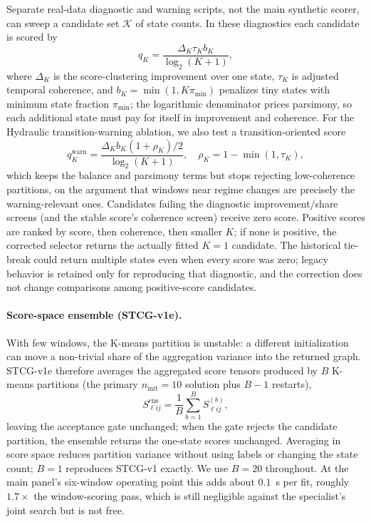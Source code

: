 \documentclass[sigconf,anonymous]{acmart}
\begin{document}
Separate real-data diagnostic and warning scripts, not the main synthetic scorer, can sweep a candidate set $\mathcal{K}$ of state counts. In these diagnostics each candidate is scored by
\[
q_K = \frac{\Delta_K \tau_K b_K}{\log_2(K+1)},
\]
where $\Delta_K$ is the score-clustering improvement over one state, $\tau_K$ is adjusted temporal coherence, and $b_K=\min(1,K\pi_{\min})$ penalizes tiny states with minimum state fraction $\pi_{\min}$; the logarithmic denominator prices parsimony, so each additional state must pay for itself in improvement and coherence.
For the Hydraulic transition-warning ablation, we also test a transition-oriented score
\[
q^{\mathrm{warn}}_K =
\frac{\Delta_K b_K(1+\rho_K)/2}{\log_2(K+1)}, \quad
\rho_K = 1-\min(1,\tau_K),
\]
which keeps the balance and parsimony terms but stops rejecting low-coherence partitions, on the argument that windows near regime changes are precisely the warning-relevant ones.
Candidates failing the diagnostic improvement/share screens (and the stable score's coherence screen) receive zero score.
Positive scores are ranked by score, then coherence, then smaller $K$; if none is positive, the corrected selector returns the actually fitted $K{=}1$ candidate.
The historical tie-break could return multiple states even when every score was zero; legacy behavior is retained only for reproducing that diagnostic, and the correction does not change comparisons among positive-score candidates.

\paragraph{Score-space ensemble (STCG-v1e).}
With few windows, the K-means partition is unstable: a different initialization can move a non-trivial share of the aggregation variance into the returned graph.
STCG-v1e therefore averages the aggregated score tensors produced by $B$ K-means partitions (the primary $n_{\mathrm{init}}{=}10$ solution plus $B-1$ restarts),
\[
S^{\mathrm{ens}}_{\ell i j}=\frac{1}{B}\sum_{b=1}^{B}S^{(b)}_{\ell i j},
\]
leaving the acceptance gate unchanged; when the gate rejects the candidate partition, the ensemble returns the one-state scores unchanged.
Averaging in score space reduces partition variance without using labels or changing the state count; $B{=}1$ reproduces STCG-v1 exactly.
We use $B{=}20$ throughout. At the main panel's six-window operating point this adds about $0.1$~s per fit, roughly $1.7\times$ the window-scoring pass, which is still negligible against the specialist's joint search but is not free.
\end{document}
